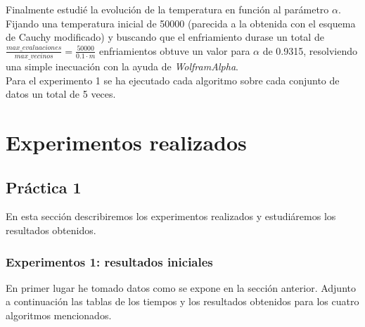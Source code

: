 \documentclass[11pt,a4paper]{article}
\begin{document}
	Finalmente estudié la evolución de la temperatura en función al parámetro $\alpha$. Fijando una temperatura inicial de 50000 (parecida a la obtenida con el esquema de Cauchy modificado) y buscando que el enfriamiento durase un total de $\frac{max\_evaluaciones}{max\_vecinos} = \frac{50000}{0.1 \cdot m}$ enfriamientos obtuve un valor para $\alpha$ de 0.9315, resolviendo una simple inecuación con la ayuda de \emph{WolframAlpha}. \\
	
	Para el experimento 1 se ha ejecutado cada algoritmo sobre cada conjunto de datos un total de 5 veces. 
	
	\section{Experimentos realizados}
	
	\subsection{Práctica 1}
	
	En esta sección describiremos los experimentos realizados y estudiáremos los resultados obtenidos. 
	
	\subsubsection{Experimentos 1: resultados iniciales}
	
	En primer lugar he tomado datos como se expone en la sección anterior. Adjunto a continuación las tablas de los tiempos y los resultados obtenidos para los cuatro algoritmos mencionados.
	
\end{document}
